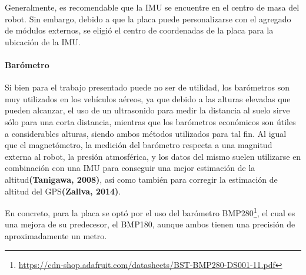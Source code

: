 Generalmente, es recomendable que la IMU se encuentre en el centro de masa del robot. Sin embargo, debido a que la placa puede personalizarse con el agregado de módulos externos, se eligió el centro de coordenadas de la placa para la ubicación de la IMU.

\paragraph{Barómetro}
Si bien para el trabajo presentado puede no ser de utilidad, los barómetros son muy utilizados en los vehículos aéreos, ya que debido a las alturas elevadas que pueden alcanzar, el uso de un ultrasonido para medir la distancia al suelo sirve sólo para una corta distancia, mientras que los barómetros económicos son útiles a considerables alturas, siendo ambos métodos utilizados para tal fin. Al igual que el magnetómetro, la medición del barómetro respecta a una magnitud externa al robot, la presión atmosférica, y los datos del mismo suelen utilizarse en combinación con una IMU para conseguir una mejor estimación de la altitud\textbf{(Tanigawa, 2008)}, así como también para corregir la estimación de altitud del GPS\textbf{(Zaliva, 2014)}.

En concreto, para la placa se optó por el uso del barómetro BMP280\footnote{\url{https://cdn-shop.adafruit.com/datasheets/BST-BMP280-DS001-11.pdf}}, el cual es una mejora de su predecesor, el BMP180, aunque ambos tienen una precisión de aproximadamente un metro.

